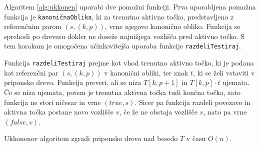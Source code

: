 Algoritem \ref{alg:ukkonen} uporabi dve pomožni funkciji. Prva uporabljena pomožna funkcija je \texttt{kanoničnaOblika}, ki za trenutno aktivno točko, predstavljeno z referenčnim parom $(s,(k, p))$, vrne njegovo kanonično obliko. Funkcija se sprehodi po drevesu dokler ne doseže najnižjega vozlišča pred aktivno točko. S tem korakom je omogočena učinkovitejša uporaba funkcije \texttt{razdeliTestiraj}.

Funkcija \texttt{razdeliTestiraj} prejme kot vhod trenutno aktivno točko, ki je podana kot referenčni par $(s,(k,p))$ v kanonični obliki, ter znak $t$, ki se želi vstaviti v priponsko drevo. Funkcija preveri, ali se niza $T[k,p+1]$ in $T[k,p]\cdot t$ ujemata. Če se niza ujemata, potem je trenutna aktivna točka tudi končna točka, zato funkcija ne stori ničesar in vrne $(\textit{true},s)$. Sicer pa funkcija razdeli povezavo in aktivna točka postane novo vozlišče $v$, če že ne obstaja vozlišče $v$, nato pa vrne $(\textit{false},v)$. 


\begin{izr} \label{izr:ukkonen}
    Ukkonenov algoritem zgradi priponsko drevo nad besedo $T$ v času $O(n)$.
\end{izr}


